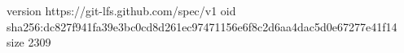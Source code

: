 version https://git-lfs.github.com/spec/v1
oid sha256:dc827f941fa39e3bc0cd8d261ec97471156e6f8c2d6aa4dac5d0e67277e41f14
size 2309
